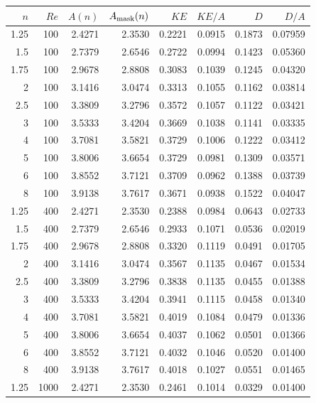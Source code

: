 \documentclass[11pt]{article}
\begin{document}
\begin{table}[H]
\label{tab:energy30}
\begin{tabular}{@{}rrrrrrrr@{}}
\toprule
$n$ & $Re$ & $A(n)$ & $A_{\rm mask}(n)$ & $KE$ & $KE/A$ & $D$ & $D/A$ \\
\midrule
 1.25 &  100 &  2.4271 &  2.3530 &  0.2221 &  0.0915 &  0.1873 &  0.07959 \\
  1.5 &  100 &  2.7379 &  2.6546 &  0.2722 &  0.0994 &  0.1423 &  0.05360 \\
 1.75 &  100 &  2.9678 &  2.8808 &  0.3083 &  0.1039 &  0.1245 &  0.04320 \\
    2 &  100 &  3.1416 &  3.0474 &  0.3313 &  0.1055 &  0.1162 &  0.03814 \\
  2.5 &  100 &  3.3809 &  3.2796 &  0.3572 &  0.1057 &  0.1122 &  0.03421 \\
    3 &  100 &  3.5333 &  3.4204 &  0.3669 &  0.1038 &  0.1141 &  0.03335 \\
    4 &  100 &  3.7081 &  3.5821 &  0.3729 &  0.1006 &  0.1222 &  0.03412 \\
    5 &  100 &  3.8006 &  3.6654 &  0.3729 &  0.0981 &  0.1309 &  0.03571 \\
    6 &  100 &  3.8552 &  3.7121 &  0.3709 &  0.0962 &  0.1388 &  0.03739 \\
    8 &  100 &  3.9138 &  3.7617 &  0.3671 &  0.0938 &  0.1522 &  0.04047 \\
 1.25 &  400 &  2.4271 &  2.3530 &  0.2388 &  0.0984 &  0.0643 &  0.02733 \\
  1.5 &  400 &  2.7379 &  2.6546 &  0.2933 &  0.1071 &  0.0536 &  0.02019 \\
 1.75 &  400 &  2.9678 &  2.8808 &  0.3320 &  0.1119 &  0.0491 &  0.01705 \\
    2 &  400 &  3.1416 &  3.0474 &  0.3567 &  0.1135 &  0.0467 &  0.01534 \\
  2.5 &  400 &  3.3809 &  3.2796 &  0.3838 &  0.1135 &  0.0455 &  0.01388 \\
    3 &  400 &  3.5333 &  3.4204 &  0.3941 &  0.1115 &  0.0458 &  0.01340 \\
    4 &  400 &  3.7081 &  3.5821 &  0.4019 &  0.1084 &  0.0479 &  0.01336 \\
    5 &  400 &  3.8006 &  3.6654 &  0.4037 &  0.1062 &  0.0501 &  0.01366 \\
    6 &  400 &  3.8552 &  3.7121 &  0.4032 &  0.1046 &  0.0520 &  0.01400 \\
    8 &  400 &  3.9138 &  3.7617 &  0.4018 &  0.1027 &  0.0551 &  0.01465 \\
 1.25 & 1000 &  2.4271 &  2.3530 &  0.2461 &  0.1014 &  0.0329 &  0.01400 \\

\end{tabular}
\end{table}
\end{document}
